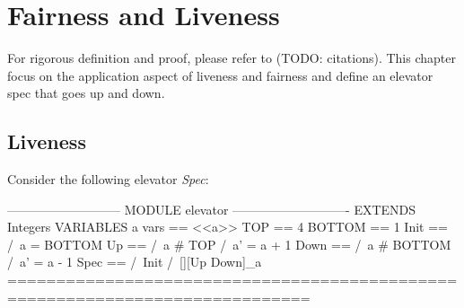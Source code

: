 \chapter{Fairness and Liveness}
\label{chap:fairness}

For rigorous definition and proof, please refer to (TODO: citations). This
chapter focus on the application aspect of liveness and fairness and define an elevator 
spec that goes up and down.\newline


\section{Liveness}

Consider the following elevator \textit{Spec}:
\begin{tla}
--------------------------- MODULE elevator ----------------------------
EXTENDS Integers
VARIABLES a
vars == <<a>>
TOP     == 4
BOTTOM  == 1
Init ==
    /\ a = BOTTOM
Up == 
    /\ a # TOP
    /\ a' = a + 1
Down == 
    /\ a # BOTTOM
    /\ a' = a - 1
Spec ==
  /\ Init
  /\ [][Up \/ Down]_a
=============================================================================
\end{tla}
\begin{tlatex}
\@x{}\moduleLeftDash{}\moduleRightDash\@xx{}%
%
%
%
%
%
%
%
%
%
%
%
%
%
%
%
%
\@x{}\bottombar\@xx{}%
\end{tlatex}


